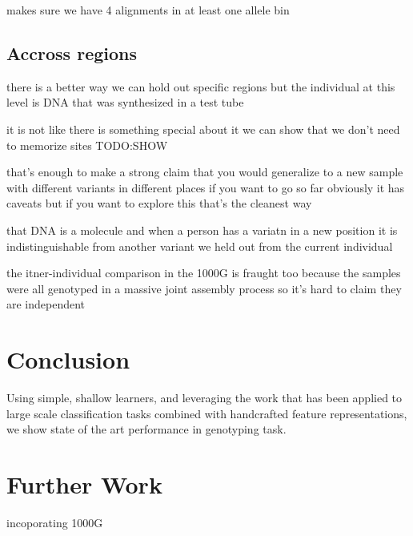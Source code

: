 \documentclass{article}
\begin{document}

makes sure we have 4 alignments in at least one allele bin

\subsection{Accross regions}
there is a better way
we can hold out specific regions
but the individual
at this level
is DNA that was synthesized in a test tube

it is not like there is something special about it
we can show that we don't need to memorize sites
TODO:SHOW

that's enough to make a strong claim that you would generalize to a new sample with different variants in different places
if you want to go so far
obviously it has caveats but if you want to explore this that's the cleanest way

that DNA is a molecule and when a person has a variatn in a new position it is indistinguishable from another variant we held out from the current individual

the itner-individual comparison in the 1000G is fraught too
because the samples were all genotyped in a massive joint assembly process
so it's hard to claim they are independent

\section{Conclusion}

Using simple, shallow learners, and leveraging the work that has been applied to large scale classification tasks combined with handcrafted feature representations, we show state of the art performance in genotyping task.



\section{Further Work}
incoporating 1000G




\small



\end{document}

